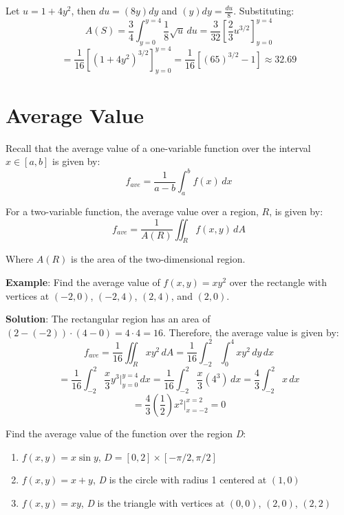 Let $u = 1 + 4y^2$, then $du = (8y)dy$ and $(y)dy = \frac{du}{8}$. Substituting:
$$A(S) = \frac{3}{4} \int_{y = 0}^{y = 4} \frac{1}{8} \sqrt{u}\,du = \frac{3}{
32} \left[ \frac{2}{3} u^{3/2} \right]_{y = 0}^{y = 4}$$
$$= \frac{1}{16} \left[ \left(1 + 4y^2 \right)^{3/2} \right]_{y = 0}^{y = 4} = 
\frac{1}{16} \left[ \left( 65 \right)^{3/2} - 1 \right] \approx 32.69$$



\section{Average Value}
Recall that the average value of a one-variable function over the interval $x 
\in [a, b]$ is given by:
$$f_{ave} = \frac{1}{a - b}\int_a^b f(x)\,dx$$

For a two-variable function, the average value over a region, $R$, is given by:
$$f_{ave} = \frac{1}{A(R)} \iint_{R} f(x, y)\,dA$$

Where $A(R)$ is the area of the two-dimensional region. 

\textbf{Example}: Find the average value of $f(x, y) = xy^2$ over the rectangle
with vertices at $(-2, 0)$, $(-2, 4)$, $(2, 4)$, and $(2, 0)$. 

\textbf{Solution}: The rectangular region has an area of $(2 - (-2)) \cdot (4 -
0) = 4 \cdot 4 = 16$. Therefore, the average value is given by:
$$f_{ave} = \frac{1}{16} \iint_{R} xy^2\,dA = \frac{1}{16} \int_{-2}^2 \int_0^4
xy^2\,dy\,dx$$
$$= \frac{1}{16} \int_{-2}^2 \frac{x}{3} y^3|_{y = 0}^{y = 4}\,dx = \frac{1}{
16} \int_{-2}^2 \frac{x}{3} \left(4^3 \right)\,dx = \frac{4}{3} \int_{-2}^2 x\,
dx$$
$$= \frac{4}{3} \left( \frac{1}{2} \right) x^2|_{x = -2}^{x = 2} = 0$$

\begin{Exercise}[title = {Average Value}, label = avg]
Find the average value of the function over the region \textit{D}:
\begin{enumerate}
\item $f(x, y) = x\sin{y}$, $\textit{D} = [0, 2] \times [-\pi/2, \pi/2]$
\item $f(x, y) = x + y$, \textit{D} is the circle with radius 1 centered at 
$(1, 0)$
\item $f(x, y) = xy$, \textit{D} is the triangle with vertices at $(0, 0)$, 
$(2, 0)$, $(2, 2)$
\end{enumerate}
\vspace{70mm}
\end{Exercise}

